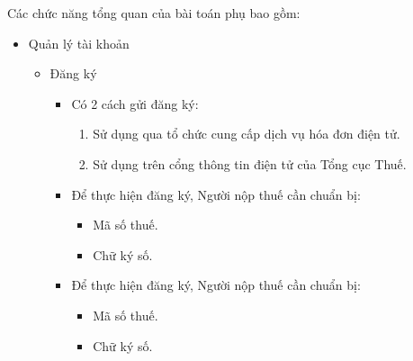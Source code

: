 Các chức năng tổng quan của bài toán phụ bao gồm:
\begin{itemize}
    \item Quản lý tài khoản
          \begin{itemize}
              \item Đăng ký
                    \begin{itemize}
                        \item     Có  2  cách  gửi     đăng ký:
                              \begin{enumerate}
                                  \item  Sử dụng qua tổ chức cung cấp dịch vụ hóa đơn điện tử.
                                  \item  Sử dụng trên cổng thông tin điện tử của Tổng cục Thuế.
                              \end{enumerate}
                              \item Để thực hiện đăng ký, Người nộp thuế   cần chuẩn bị:
                                    \begin{itemize}
                                        \item    Mã số thuế.
                                        \item   Chữ ký số.
                                    \end{itemize}
                                    \item Để thực hiện đăng ký, Người nộp thuế   cần chuẩn bị:
                                          \begin{itemize}
                                              \item    Mã số thuế.
                                              \item   Chữ ký số.
                                          \end{itemize}
                    \end{itemize}
          \end{itemize}
\end{itemize}



